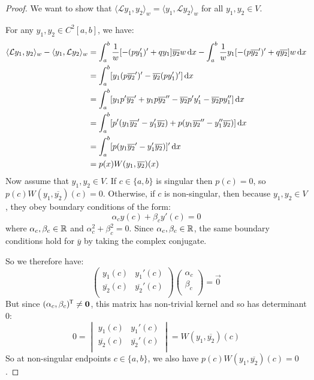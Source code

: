 \documentclass[../main.tex]{subfiles}
\begin{document}
\begin{proof}
  We want to show that $\langle \mathcal{L}y_1, y_2 \rangle_{w} = \langle y_1, \mathcal{L}y_2 \rangle_{w}$ for all $y_1, y_2 \in V$.

  For any $y_1, y_2 \in C^2[a, b]$, we have:
  \begin{align*}
    \langle \mathcal{L}y_1, y_2 \rangle_{w} - \langle y_1, \mathcal{L}y_2 \rangle_{w} &= \int_{a}^{b} \frac{1}{w}[-(py_1')' + qy_1]\overline{y_2} w\d{x} - \int_{a}^{b} \frac{1}{w} y_1[-(p \overline{y_2}')' + q \overline{y_2}]w \d{x} \\
                                                                                      &= \int_{a}^{b} [y_1(p \overline{y_2}')' - \overline{y_2}(p y_1')'] \d{x} \\
                                                                                      &= \int_{a}^{b} [y_1 p' \overline{y_2}' + y_1 p \overline{y_2}'' - \overline{y_2} p' y_1' - \overline{y_2} p y_1''] \d{x} \\
                                                                                      &= \int_{a}^{b} [p'(y_1 \overline{y_2}' - y_1'\overline{y_2}) + p(y_1 \overline{y_2}'' - y_1'' \overline{y_2})] \d{x} \\
                                                                                      &= \int_{a}^{b} [p(y_1 \overline{y_2}' - y_1' \overline{y_2})]' \d{x} \\
                                                                                      &= p(x) W(y_1, \overline{y_2})(x)
  \end{align*}
  Now assume that $y_1, y_2 \in V$.
  If $c \in \{a, b\}$ is singular then $p(c) = 0$, so $p(c) W(y_1, \overline{y_2})(c) = 0$.
  Otherwise, if $c$ is non-singular, then because $y_1, y_2 \in V$, they obey boundary conditions of the form:
  \[
    \alpha_c y(c) + \beta_c y'(c) = 0
  \]
  where $\alpha_c, \beta_c \in \mathbb{R}$ and $\alpha_c^2 + \beta_c^2 = 0$.
  Since $\alpha_c, \beta_c \in \mathbb{R}$, the same boundary conditions hold for $\overline{y}$ by taking the complex conjugate.

  So we therefore have:
  \[
    \begin{pmatrix}
    y_1(c) & y_1'(c) \\
    \overline{y_2}(c) & \overline{y_2}'(c) \\
    \end{pmatrix} \begin{pmatrix}
    \alpha_c \\
    \beta_c \\
    \end{pmatrix} = \vec{0}
  \]
  But since $(\alpha_c, \beta_c)^{{\mkern-1.5mu\mathsf{T}}} \neq \mathbf{\bm{0}}$, this matrix has non-trivial kernel and so has determinant 0:
  \[
    0 = \begin{vmatrix}
    y_1(c) & y_1'(c) \\
    \overline{y_2}(c) & \overline{y_2}'(c) \\
    \end{vmatrix} = W(y_1, \overline{y_2})(c)
  \]
  So at non-singular endpoints $c \in \{a, b\}$, we also have $p(c) W(y_1, \overline{y_2})(c) = 0$.


\end{proof}
\end{document}

